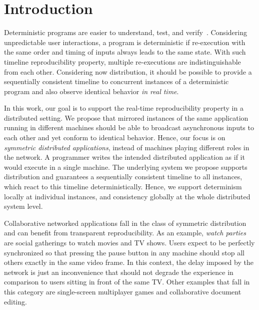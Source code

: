 \documentclass[sigplan,screen]{acmart}
\begin{document}

\maketitle

\section{Introduction}

Deterministic programs are easier to understand, test, and verify~\cite{det}.
Considering unpredictable user interactions, a program is deterministic if
re-execution with the same order and timing of inputs always leads to the same
state.
With such timeline reproducibility property, multiple re-executions are
indistinguishable from each other.
Considering now distribution, it should be possible to provide a
sequentially consistent timeline to concurrent instances of a deterministic
program and also observe identical behavior \emph{in real time}.

In this work, our goal is to support the real-time reproducibility property in
a distributed setting.
We propose that mirrored instances of the same application running in different
machines should be able to broadcast asynchronous inputs to each other and yet
conform to identical behavior.
Hence, our focus is on \emph{symmetric distributed applications}, instead of
machines playing different roles in the network.
A programmer writes the intended distributed application as if it would execute
in a single machine.
The underlying system we propose supports distribution and guarantees a
sequentially consistent timeline to all instances, which react to this timeline
deterministically.
Hence, we support determinism locally at individual instances, and consistency
globally at the whole distributed system level.

Collaborative networked applications fall in the class of symmetric
distribution and can benefit from transparent reproducibility.
As an example, \emph{watch parties} are social gatherings to watch movies and
TV shows.
Users expect to be perfectly synchronized so that pressing the pause button in
any machine should stop all others exactly in the same video frame.
In this context, the delay imposed by the network is just an inconvenience that
should not degrade the experience in comparison to users sitting in front of
the same TV.
Other examples that fall in this category are single-screen multiplayer games
and collaborative document editing.
\end{document}
